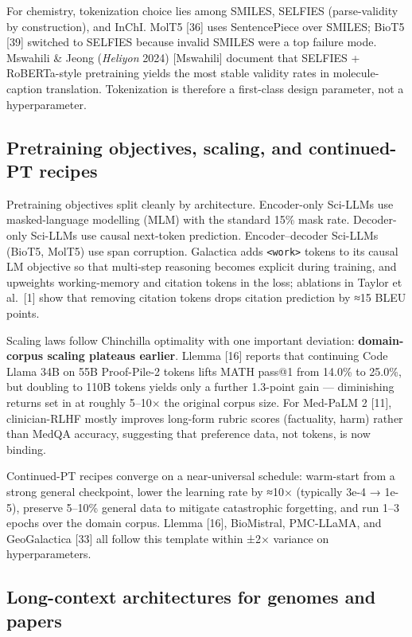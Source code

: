 For chemistry, tokenization choice lies among SMILES, SELFIES (parse-validity by construction), and InChI. MolT5 {[}36{]} uses SentencePiece over SMILES; BioT5 {[}39{]} switched to SELFIES because invalid SMILES were a top failure mode. Mswahili \& Jeong (\emph{Heliyon} 2024) {[}Mswahili{]} document that SELFIES + RoBERTa-style pretraining yields the most stable validity rates in molecule-caption translation. Tokenization is therefore a first-class design parameter, not a hyperparameter.

\subsection{Pretraining objectives, scaling, and continued-PT recipes}\label{pretraining-objectives-scaling-and-continued-pt-recipes}

Pretraining objectives split cleanly by architecture. Encoder-only Sci-LLMs use masked-language modelling (MLM) with the standard 15\% mask rate. Decoder-only Sci-LLMs use causal next-token prediction. Encoder--decoder Sci-LLMs (BioT5, MolT5) use span corruption. Galactica adds \texttt{\textless{}work\textgreater{}} tokens to its causal LM objective so that multi-step reasoning becomes explicit during training, and upweights working-memory and citation tokens in the loss; ablations in Taylor et al.~{[}1{]} show that removing citation tokens drops citation prediction by ≈15 BLEU points.

Scaling laws follow Chinchilla optimality with one important deviation: \textbf{domain-corpus scaling plateaus earlier}. Llemma {[}16{]} reports that continuing Code Llama 34B on 55B Proof-Pile-2 tokens lifts MATH pass@1 from 14.0\% to 25.0\%, but doubling to 110B tokens yields only a further 1.3-point gain --- diminishing returns set in at roughly 5--10× the original corpus size. For Med-PaLM 2 {[}11{]}, clinician-RLHF mostly improves long-form rubric scores (factuality, harm) rather than MedQA accuracy, suggesting that preference data, not tokens, is now binding.

Continued-PT recipes converge on a near-universal schedule: warm-start from a strong general checkpoint, lower the learning rate by ≈10× (typically 3e-4 → 1e-5), preserve 5--10\% general data to mitigate catastrophic forgetting, and run 1--3 epochs over the domain corpus. Llemma {[}16{]}, BioMistral, PMC-LLaMA, and GeoGalactica {[}33{]} all follow this template within ±2× variance on hyperparameters.

\subsection{Long-context architectures for genomes and papers}\label{long-context-architectures-for-genomes-and-papers}

